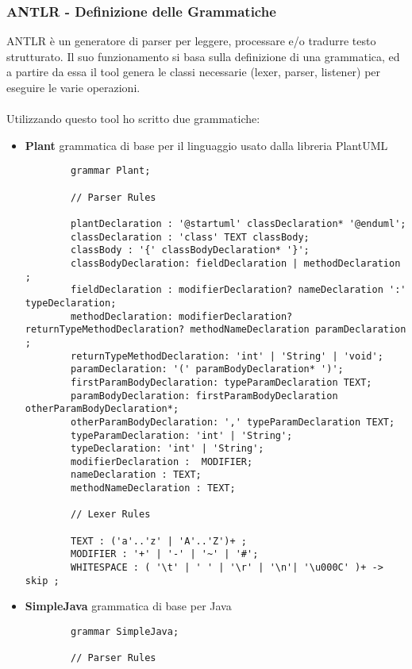 \documentclass{article}
\begin{document}
  \subsubsection{ANTLR - Definizione delle Grammatiche}
  ANTLR è un generatore di parser per leggere, processare e/o tradurre testo strutturato. Il suo funzionamento si basa sulla definizione di una grammatica, ed a partire
  da essa il tool genera le classi necessarie (lexer, parser, listener) per eseguire le varie operazioni.\\
  \\Utilizzando questo tool ho scritto due grammatiche:
  \begin{itemize}
    \item \textbf{Plant} grammatica di base per il linguaggio usato dalla libreria PlantUML
      \begin{lstlisting}
        grammar Plant;

        // Parser Rules

        plantDeclaration : '@startuml' classDeclaration* '@enduml';
        classDeclaration : 'class' TEXT classBody;
        classBody : '{' classBodyDeclaration* '}';
        classBodyDeclaration: fieldDeclaration | methodDeclaration ;
        fieldDeclaration : modifierDeclaration? nameDeclaration ':' typeDeclaration;
        methodDeclaration: modifierDeclaration? returnTypeMethodDeclaration? methodNameDeclaration paramDeclaration  ;
        returnTypeMethodDeclaration: 'int' | 'String' | 'void';
        paramDeclaration: '(' paramBodyDeclaration* ')';
        firstParamBodyDeclaration: typeParamDeclaration TEXT;
        paramBodyDeclaration: firstParamBodyDeclaration otherParamBodyDeclaration*;
        otherParamBodyDeclaration: ',' typeParamDeclaration TEXT;
        typeParamDeclaration: 'int' | 'String';
        typeDeclaration: 'int' | 'String';
        modifierDeclaration :  MODIFIER;
        nameDeclaration : TEXT;
        methodNameDeclaration : TEXT;

        // Lexer Rules

        TEXT : ('a'..'z' | 'A'..'Z')+ ;
        MODIFIER : '+' | '-' | '~' | '#';
        WHITESPACE : ( '\t' | ' ' | '\r' | '\n'| '\u000C' )+ -> skip ;
      \end{lstlisting}
    \item \textbf{SimpleJava} grammatica di base per Java
      \begin{lstlisting}
        grammar SimpleJava;

        // Parser Rules


\end{lstlisting}
\end{itemize}
\end{document}
